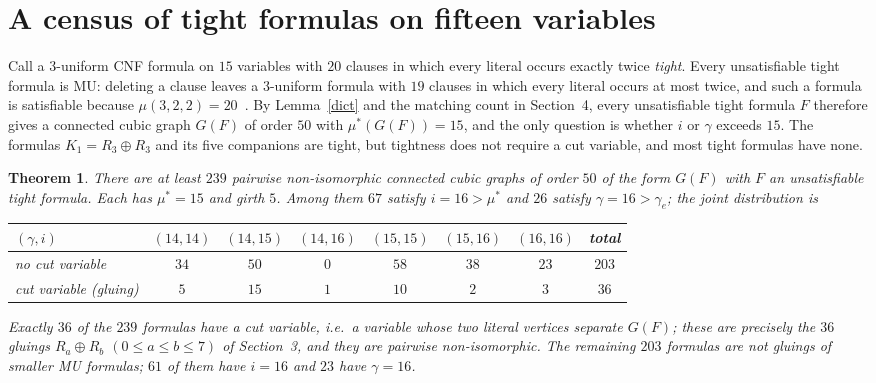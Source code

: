 \documentclass[11pt]{article}
\newtheorem{theorem}{Theorem}\newtheorem{lemma}[theorem]{Lemma}\newtheorem{proposition}[theorem]{Proposition}
\theoremstyle{remark}\newtheorem{remark}[theorem]{Remark}
\begin{document}
\section{A census of tight formulas on fifteen variables}\label{census}
Call a $3$-uniform CNF formula on $15$ variables with $20$ clauses in which every literal occurs exactly twice \emph{tight}. Every unsatisfiable tight formula is MU: deleting a clause leaves a $3$-uniform formula with $19$ clauses in which every literal occurs at most twice, and such a formula is satisfiable because $\mu(3,2,2)=20$~\cite{ZPS}. By Lemma~\ref{dict} and the matching count in Section~4, every unsatisfiable tight formula $F$ therefore gives a connected cubic graph $G(F)$ of order $50$ with $\mu^*(G(F))=15$, and the only question is whether $i$ or $\gamma$ exceeds $15$. The formulas $K_1=R_3\oplus R_3$ and its five companions are tight, but tightness does not require a cut variable, and most tight formulas have none.
\begin{theorem}\label{censusthm}
There are at least $239$ pairwise non-isomorphic connected cubic graphs of order $50$ of the form $G(F)$ with $F$ an unsatisfiable tight formula. Each has $\mu^*=15$ and girth $5$. Among them $67$ satisfy $i=16>\mu^*$ and $26$ satisfy $\gamma=16>\gamma_e$; the joint distribution is
\begin{center}\begin{tabular}{lccccccc}\toprule
$(\gamma,i)$ & $(14,14)$ & $(14,15)$ & $(14,16)$ & $(15,15)$ & $(15,16)$ & $(16,16)$ & total\\\midrule
no cut variable & $34$ & $50$ & $0$ & $58$ & $38$ & $23$ & $203$\\
cut variable (gluing) & $5$ & $15$ & $1$ & $10$ & $2$ & $3$ & $36$\\\bottomrule
\end{tabular}\end{center}
Exactly $36$ of the $239$ formulas have a cut variable, i.e.\ a variable whose two literal vertices separate $G(F)$; these are precisely the $36$ gluings $R_a\oplus R_b$ $(0\le a\le b\le7)$ of Section~3, and they are pairwise non-isomorphic. The remaining $203$ formulas are not gluings of smaller MU formulas; $61$ of them have $i=16$ and $23$ have $\gamma=16$.
\end{theorem}
\end{document}
